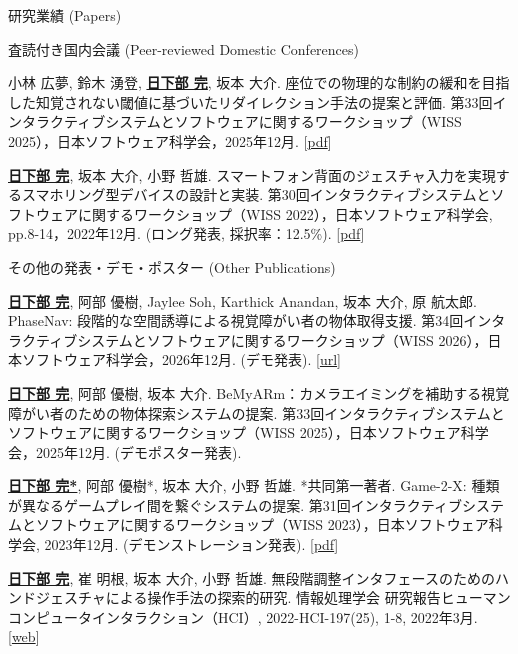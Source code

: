 \documentclass[
	11pt, %
]{resume} %
\begin{document}
\begin{rSection}{研究業績 (Papers)}
\begin{rSubsection}{査読付き国内会議 (Peer-reviewed Domestic Conferences)}{}{}{}
		\item 小林 広夢, 鈴木 湧登, \underline{\textbf{日下部 完}}, 坂本 大介. 座位での物理的な制約の緩和を目指した知覚されない閾値に基づいたリダイレクション手法の提案と評価. 第33回インタラクティブシステムとソフトウェアに関するワークショップ（WISS 2025），日本ソフトウェア科学会，2025年12月. [\href{www.wiss.org/WISS2025/downloads/proceedings.pdf}{pdf}] 
        
		\item \underline{\textbf{日下部 完}}, 坂本 大介, 小野 哲雄. スマートフォン背面のジェスチャ入力を実現するスマホリング型デバイスの設計と実装. 第30回インタラクティブシステムとソフトウェアに関するワークショップ（WISS 2022），日本ソフトウェア科学会, pp.8-14，2022年12月. (ロング発表, 採択率：12.5\%). [\href{www.wiss.org/WISS2022Proceedings/data/02.pdf}{pdf}]
	\end{rSubsection}
	\begin{rSubsection}{その他の発表・デモ・ポスター (Other Publications)}{}{}{}
        \item \underline{\textbf{日下部 完}}, 阿部 優樹, Jaylee Soh, Karthick Anandan, 坂本 大介, 原 航太郎. PhaseNav: 段階的な空間誘導による視覚障がい者の物体取得支援. 第34回インタラクティブシステムとソフトウェアに関するワークショップ（WISS 2026），日本ソフトウェア科学会，2026年12月. (デモ発表). [\href{https://www.wiss.org/WISS2026/demo.html}{url}]
        \item \underline{\textbf{日下部 完}}, 阿部 優樹, 坂本 大介. BeMyARm：カメラエイミングを補助する視覚障がい者のための物体探索システムの提案. 第33回インタラクティブシステムとソフトウェアに関するワークショップ（WISS 2025），日本ソフトウェア科学会，2025年12月. (デモポスター発表).

		\item \underline{\textbf{日下部 完*}}, 阿部 優樹*, 坂本 大介, 小野 哲雄. *共同第一著者. Game-2-X: 種類が異なるゲームプレイ間を繋ぐシステムの提案. 第31回インタラクティブシステムとソフトウェアに関するワークショップ（WISS 2023），日本ソフトウェア科学会, 2023年12月. (デモンストレーション発表). [\href{www.wiss.org/WISS2023Proceedings/data/1-A03.pdf}{pdf}]
        
		\item \underline{\textbf{日下部 完}}, 崔 明根, 坂本 大介, 小野 哲雄. 無段階調整インタフェースのためのハンドジェスチャによる操作手法の探索的研究. 情報処理学会 研究報告ヒューマンコンピュータインタラクション（HCI）, 2022-HCI-197(25), 1-8, 2022年3月. [\href{ipsj.ixsq.nii.ac.jp/records/217445}{web}]
	\end{rSubsection}


\end{rSection}
\end{document}
